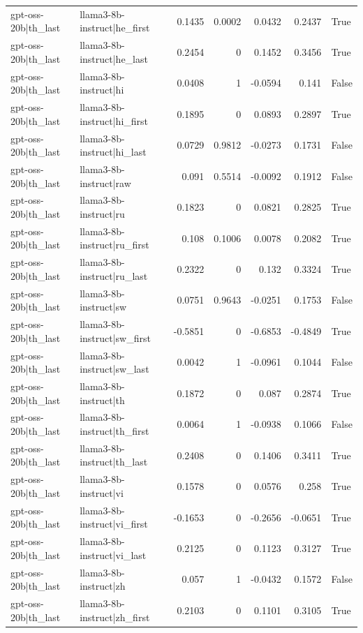 \begin{table}
\begin{tabular}{l l r r r r l}
gpt-oss-20b|th_last & llama3-8b-instruct|he_first & 0.1435 & 0.0002 & 0.0432 & 0.2437 & True \\
gpt-oss-20b|th_last & llama3-8b-instruct|he_last & 0.2454 & 0 & 0.1452 & 0.3456 & True \\
gpt-oss-20b|th_last & llama3-8b-instruct|hi & 0.0408 & 1 & -0.0594 & 0.141 & False \\
gpt-oss-20b|th_last & llama3-8b-instruct|hi_first & 0.1895 & 0 & 0.0893 & 0.2897 & True \\
gpt-oss-20b|th_last & llama3-8b-instruct|hi_last & 0.0729 & 0.9812 & -0.0273 & 0.1731 & False \\
gpt-oss-20b|th_last & llama3-8b-instruct|raw & 0.091 & 0.5514 & -0.0092 & 0.1912 & False \\
gpt-oss-20b|th_last & llama3-8b-instruct|ru & 0.1823 & 0 & 0.0821 & 0.2825 & True \\
gpt-oss-20b|th_last & llama3-8b-instruct|ru_first & 0.108 & 0.1006 & 0.0078 & 0.2082 & True \\
gpt-oss-20b|th_last & llama3-8b-instruct|ru_last & 0.2322 & 0 & 0.132 & 0.3324 & True \\
gpt-oss-20b|th_last & llama3-8b-instruct|sw & 0.0751 & 0.9643 & -0.0251 & 0.1753 & False \\
gpt-oss-20b|th_last & llama3-8b-instruct|sw_first & -0.5851 & 0 & -0.6853 & -0.4849 & True \\
gpt-oss-20b|th_last & llama3-8b-instruct|sw_last & 0.0042 & 1 & -0.0961 & 0.1044 & False \\
gpt-oss-20b|th_last & llama3-8b-instruct|th & 0.1872 & 0 & 0.087 & 0.2874 & True \\
gpt-oss-20b|th_last & llama3-8b-instruct|th_first & 0.0064 & 1 & -0.0938 & 0.1066 & False \\
gpt-oss-20b|th_last & llama3-8b-instruct|th_last & 0.2408 & 0 & 0.1406 & 0.3411 & True \\
gpt-oss-20b|th_last & llama3-8b-instruct|vi & 0.1578 & 0 & 0.0576 & 0.258 & True \\
gpt-oss-20b|th_last & llama3-8b-instruct|vi_first & -0.1653 & 0 & -0.2656 & -0.0651 & True \\
gpt-oss-20b|th_last & llama3-8b-instruct|vi_last & 0.2125 & 0 & 0.1123 & 0.3127 & True \\
gpt-oss-20b|th_last & llama3-8b-instruct|zh & 0.057 & 1 & -0.0432 & 0.1572 & False \\
gpt-oss-20b|th_last & llama3-8b-instruct|zh_first & 0.2103 & 0 & 0.1101 & 0.3105 & True \\

\end{tabular}
\end{table}
